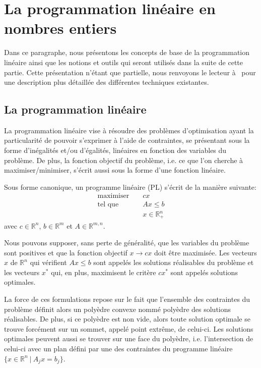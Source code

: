
\section{La programmation linéaire en nombres entiers}

Dans ce paragraphe, nous présentons les concepts de base de la
programmation linéaire ainsi que les notions et outils qui seront
utilisés dans la suite de cette partie. Cette présentation n'étant que
partielle, nous renvoyons le lecteur à~\cite{LP} pour une description
plus détaillée des différentes techniques existantes.

\subsection{La programmation linéaire}

La programmation linéaire vise à résoudre des problèmes
d'optimisation ayant la particularité de pouvoir s'exprimer à
l'aide de contraintes, se présentant sous la forme d'inégalités
et/ou d'égalités, linéaires en fonction des variables du problème.
De plus, la fonction objectif du problème, i.e. ce que l'on
cherche à maximiser/minimiser, s'écrit aussi sous la forme d'une
fonction linéaire.

Sous forme canonique, un programme linéaire (PL) s'écrit de la manière
suivante: 
 \[ \begin{array}{lcl}
\text{maximiser } & & \displaystyle cx\\ 
\text{tel que }& & \displaystyle Ax \le b\\
 & & \displaystyle x \in \mathbb{R}^n_+
 \end{array}
\]
avec $c \in \mathbb{R}^n$, $b \in \mathbb{R}^m$ et $A \in
\mathbb{R}^{m,n}$. 

Nous pouvons supposer, sans perte de généralité, que les variables du
problème sont positives et que la fonction objectif $x\rightarrow cx$
doit être maximisée. Les vecteurs $x$ de $\mathbb{R}^n$ qui vérifient
$Ax \le b$ sont appelés les solutions réalisables du problème et les
vecteurs $x^*$ qui, en plus, maximisent le critère $cx^*$ sont appelés
solutions optimales.    

La force de ces formulations repose sur le fait que l'ensemble des
contraintes du problème définit alors un polyèdre convexe nommé
polyèdre des solutions réalisables. De plus, si ce polyèdre est non
vide, alors toute solution optimale se trouve forcément sur un sommet,
appelé point extrême, de celui-ci. Les solutions optimales peuvent aussi
se trouver sur une face du polyèdre, i.e. l'intersection de celui-ci
avec un plan défini par une des contraintes du programme linéaire $\{x
\in \mathbb{R}^n\ | \ A_jx=b_j\}$. 

